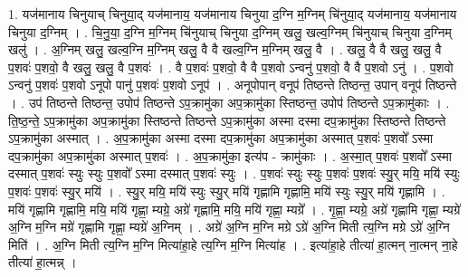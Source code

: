 \documentclass[17pt]{extarticle}
\begin{document}
1. यज॑मानाय चिनुयाच् चिनुया॒द् यज॑मानाय॒ यज॑मानाय चिनुया द॒ग्नि म॒ग्निम् चि॑नुया॒द् यज॑मानाय॒ यज॑मानाय चिनुया द॒ग्निम् । . चि॒नु॒या॒ द॒ग्नि म॒ग्निम् चि॑नुयाच् चिनुया द॒ग्निम् खलु॒ खल्व॒ग्निम् चि॑नुयाच् चिनुया द॒ग्निम् खलु॑ । . अ॒ग्निम् खलु॒ खल्व॒ग्नि म॒ग्निम् खलु॒ वै वै खल्व॒ग्नि म॒ग्निम् खलु॒ वै । . खलु॒ वै वै खलु॒ खलु॒ वै प॒शवः॑ प॒शवो॒ वै खलु॒ खलु॒ वै प॒शवः॑ । . वै प॒शवः॑ प॒शवो॒ वै वै प॒शवो ऽन्वनु॑ प॒शवो॒ वै वै प॒शवो ऽनु॑ । . प॒शवो ऽन्वनु॑ प॒शवः॑ प॒शवो ऽनूपो पानु॑ प॒शवः॑ प॒शवो ऽनूप॑ । . अनूपोपान् वनूप॑ तिष्ठन्ते तिष्ठन्त॒ उपान् वनूप॑ तिष्ठन्ते । . उप॑ तिष्ठन्ते तिष्ठन्त॒ उपोप॑ तिष्ठन्ते ऽप॒क्रामु॑का अप॒क्रामु॑का स्तिष्ठन्त॒ उपोप॑ तिष्ठन्ते ऽप॒क्रामु॑काः । . ति॒ष्ठ॒न्ते॒ ऽप॒क्रामु॑का अप॒क्रामु॑का स्तिष्ठन्ते तिष्ठन्ते ऽप॒क्रामु॑का अस्मा दस्मा दप॒क्रामु॑का स्तिष्ठन्ते तिष्ठन्ते ऽप॒क्रामु॑का अस्मात् । . अ॒प॒क्रामु॑का अस्मा दस्मा दप॒क्रामु॑का अप॒क्रामु॑का अस्मात् प॒शवः॑ प॒शवो᳚ ऽस्मा दप॒क्रामु॑का अप॒क्रामु॑का अस्मात् प॒शवः॑ । . अ॒प॒क्रामु॑का॒ इत्य॑प - क्रामु॑काः । . अ॒स्मा॒त् प॒शवः॑ प॒शवो᳚ ऽस्मा दस्मात् प॒शवः॑ स्युः स्युः प॒शवो᳚ ऽस्मा दस्मात् प॒शवः॑ स्युः । . प॒शवः॑ स्युः स्युः प॒शवः॑ प॒शवः॑ स्यु॒र् मयि॒ मयि॑ स्युः प॒शवः॑ प॒शवः॑ स्यु॒र् मयि॑ । . स्यु॒र् मयि॒ मयि॑ स्युः स्यु॒र् मयि॑ गृह्णामि गृह्णामि॒ मयि॑ स्युः स्यु॒र् मयि॑ गृह्णामि । . मयि॑ गृह्णामि गृह्णामि॒ मयि॒ मयि॑ गृह्णा॒ म्यग्रे॒ अग्रे॑ गृह्णामि॒ मयि॒ मयि॑ गृह्णा॒ म्यग्रे᳚ । . गृ॒ह्णा॒ म्यग्रे॒ अग्रे॑ गृह्णामि गृह्णा॒ म्यग्रे॑ अ॒ग्नि म॒ग्नि मग्रे॑ गृह्णामि गृह्णा॒ म्यग्रे॑ अ॒ग्निम् । . अग्रे॑ अ॒ग्नि म॒ग्नि मग्रे ऽग्रे॑ अ॒ग्नि मिती त्य॒ग्नि मग्रे ऽग्रे॑ अ॒ग्नि मिति॑ । . अ॒ग्नि मिती त्य॒ग्नि म॒ग्नि मित्या॑हा॒हे त्य॒ग्नि म॒ग्नि मित्या॑ह । . इत्या॑हा॒हे तीत्या॑ हा॒त्मन् ना॒त्मन् ना॒हे तीत्या॑ हा॒त्मन्न् । \newline
\end{document}
